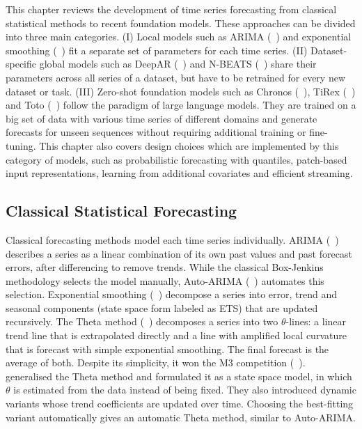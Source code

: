 This chapter reviews the development of time series forecasting from classical statistical methods to recent foundation models. These approaches can be divided into three main categories. (I) Local models such as ARIMA (\citeauthor{arima}~\cite{arima}) and exponential smoothing (\citeauthor{ets}~\cite{ets}) fit a separate set of parameters for each time series. (II) Dataset-specific global models such as DeepAR (\citeauthor{deepar}~\cite{deepar}) and N-BEATS (\citeauthor{nbeats}~\cite{nbeats}) share their parameters across all series of a dataset, but have to be retrained for every new dataset or task. (III) Zero-shot foundation models such as Chronos (\citeauthor{chronos}~\cite{chronos}), TiRex (\citeauthor{tirex1}~\cite{tirex1}) and Toto (\citeauthor{toto1}~\cite{toto1}) follow the paradigm of large language models. They are trained on a big set of data with various time series of different domains and generate forecasts for unseen sequences without requiring additional training or fine-tuning. This chapter also covers design choices which are implemented by this category of models, such as probabilistic forecasting with quantiles, patch-based input representations, learning from additional covariates and efficient streaming.


\subsection{Classical Statistical Forecasting}
\label{sec:rw_classical}

Classical forecasting methods model each time series individually. ARIMA (\citeauthor{arima}~\cite{arima}) describes a series as a linear combination of its own past values and past forecast errors, after differencing to remove trends. While the classical Box-Jenkins methodology selects the model manually, Auto-ARIMA (\citeauthor{autoarima}~\cite{autoarima}) automates this selection. Exponential smoothing (\citeauthor{ets}~\cite{ets}) decompose a series into error, trend and seasonal components (state space form labeled as ETS) that are updated recursively. The Theta method (\citeauthor{theta}~\cite{theta}) decomposes a series into two $\theta$-lines: a linear trend line that is extrapolated directly and a line with amplified local curvature that is forecast with simple exponential smoothing. The final forecast is the average of both. Despite its simplicity, it won the M3 competition (\citeauthor{m3}~\cite{m3}).  \citeauthor{autotheta}~\cite{autotheta} generalised the Theta method and formulated it as a state space model, in which $\theta$ is estimated from the data instead of being fixed. They also introduced dynamic variants whose trend coefficients are updated over time. Choosing the best-fitting variant automatically gives an automatic Theta method, similar to Auto-ARIMA.

